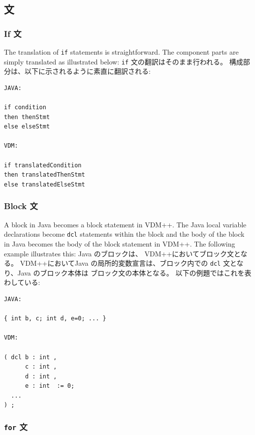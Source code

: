 \documentclass[\pformat,12pt]{jarticle}
\begin{document}
\subsection{文}

\subsubsection{If 文}

The translation of \texttt{if} statements is straightforward. The
component parts are simply translated as illustrated below:
\texttt{if} 文の翻訳はそのまま行われる。 
構成部分は、以下に示されるように素直に翻訳される:

\begin{small}
\begin{verbatim}
JAVA:

if condition
then thenStmt
else elseStmt

VDM:

if translatedCondition
then translatedThenStmt
else translatedElseStmt
\end{verbatim}
\end{small}

\subsubsection{Block 文}

A block in Java becomes a block statement in VDM++. The Java local
variable declarations become \texttt{dcl} statements within the block
and the body of the block in Java becomes the body of the block
statement in VDM++. The following example illustrates this:
Java のブロックは、 VDM++においてブロック文となる。
VDM++においてJava の局所的変数宣言は、ブロック内での \texttt{dcl} 文となり、Java のブロック本体は ブロック文の本体となる。
以下の例題ではこれを表わしている:

\begin{small}
\begin{verbatim}
JAVA:

{ int b, c; int d, e=0; ... }

VDM:

( dcl b : int ,
      c : int ,
      d : int ,
      e : int  := 0;
  ...
) ;
\end{verbatim}
\end{small}

\subsubsection{\texttt{for} 文}
\end{document}
